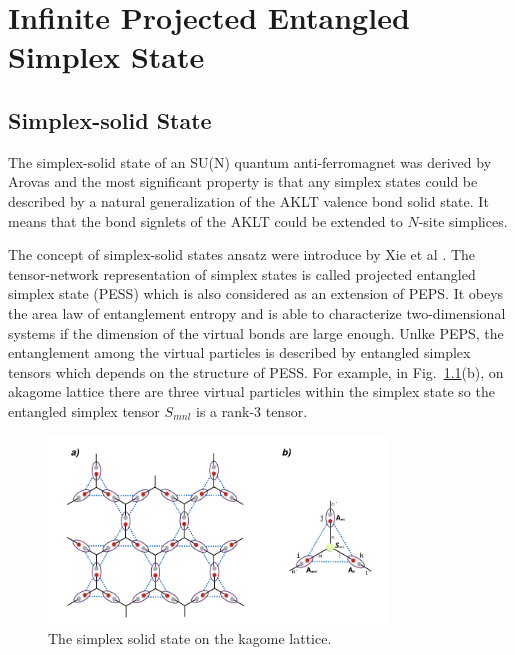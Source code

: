 \chapter{Infinite Projected Entangled Simplex State}
\label{chapter:ipess}
\section{Simplex-solid State}
\label{solidstate}
The simplex-solid state of an SU(N) quantum anti-ferromagnet was derived by Arovas \cite{PhysRevB.77.104404} and the most significant property is that any simplex states could be described by a natural generalization of the AKLT \cite{PhysRevLett.59.799} \cite{Affleck1988} valence bond solid state. It means that the bond signlets of the AKLT could be extended to $N$-site simplices.

The concept of simplex-solid states ansatz were introduce by Xie et al \cite{PhysRevX.4.011025, PhysRevB.93.075154}. The tensor-network representation of simplex states is called projected entangled simplex state (PESS) which is also considered as an extension of PEPS. It obeys the area law \cite{RevModPhys.82.277} of entanglement entropy and is able to characterize two-dimensional systems if the dimension of the virtual bonds are large enough. Unlke PEPS, the entanglement among the virtual particles is described by entangled simplex tensors which depends on the structure of PESS. For example, in Fig.~\ref{fig411}(b), on akagome lattice there are three virtual particles within the simplex state so the entangled simplex tensor $S_{mnl}$ is a rank-3 tensor.

\begin{figure}[ht]
	\centering
	\includegraphics[width=0.80\textwidth]{figures/fig411.png}
	\caption[The simplex solid state on the kagome lattice.]{The simplex solid state on the kagome lattice.}
	\label{fig411}
\end{figure}


